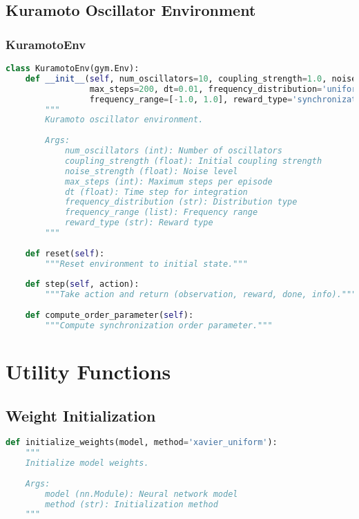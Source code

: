 \subsection{Kuramoto Oscillator Environment}

\subsubsection{KuramotoEnv}

\begin{lstlisting}[language=python]
class KuramotoEnv(gym.Env):
    def __init__(self, num_oscillators=10, coupling_strength=1.0, noise_strength=0.1,
                 max_steps=200, dt=0.01, frequency_distribution='uniform',
                 frequency_range=[-1.0, 1.0], reward_type='synchronization'):
        """
        Kuramoto oscillator environment.
        
        Args:
            num_oscillators (int): Number of oscillators
            coupling_strength (float): Initial coupling strength
            noise_strength (float): Noise level
            max_steps (int): Maximum steps per episode
            dt (float): Time step for integration
            frequency_distribution (str): Distribution type
            frequency_range (list): Frequency range
            reward_type (str): Reward type
        """
    
    def reset(self):
        """Reset environment to initial state."""
    
    def step(self, action):
        """Take action and return (observation, reward, done, info)."""
    
    def compute_order_parameter(self):
        """Compute synchronization order parameter."""
\end{lstlisting}

\section{Utility Functions}

\subsection{Weight Initialization}

\begin{lstlisting}[language=python]
def initialize_weights(model, method='xavier_uniform'):
    """
    Initialize model weights.
    
    Args:
        model (nn.Module): Neural network model
        method (str): Initialization method
    """
\end{lstlisting}

